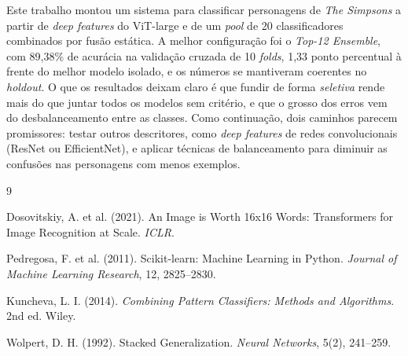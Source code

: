 \documentclass[12pt]{article}
\begin{document}
Este trabalho montou um sistema para classificar personagens de
\textit{The Simpsons} a partir de \textit{deep features} do ViT-large e de um
\textit{pool} de 20 classificadores combinados por fusão estática. A melhor
configuração foi o \textit{Top-12 Ensemble}, com 89,38\% de acurácia na validação
cruzada de 10 \textit{folds}, 1,33 ponto percentual à frente do melhor modelo
isolado, e os números se mantiveram coerentes no \textit{holdout}. O que os
resultados deixam claro é que fundir de forma \textit{seletiva} rende mais do que
juntar todos os modelos sem critério, e que o grosso dos erros vem do
desbalanceamento entre as classes. Como continuação, dois caminhos parecem
promissores: testar outros descritores, como \textit{deep features} de redes
convolucionais (ResNet ou EfficientNet), e aplicar técnicas de balanceamento para
diminuir as confusões nas personagens com menos exemplos.

\begin{thebibliography}{9}

 Dosovitskiy, A. et al. (2021). An Image is Worth 16x16 Words:
Transformers for Image Recognition at Scale. \textit{ICLR}.

 Pedregosa, F. et al. (2011). Scikit-learn: Machine Learning in
Python. \textit{Journal of Machine Learning Research}, 12, 2825--2830.

 Kuncheva, L. I. (2014). \textit{Combining Pattern Classifiers:
Methods and Algorithms}. 2nd ed. Wiley.

 Wolpert, D. H. (1992). Stacked Generalization.
\textit{Neural Networks}, 5(2), 241--259.

\end{thebibliography}
\end{document}

